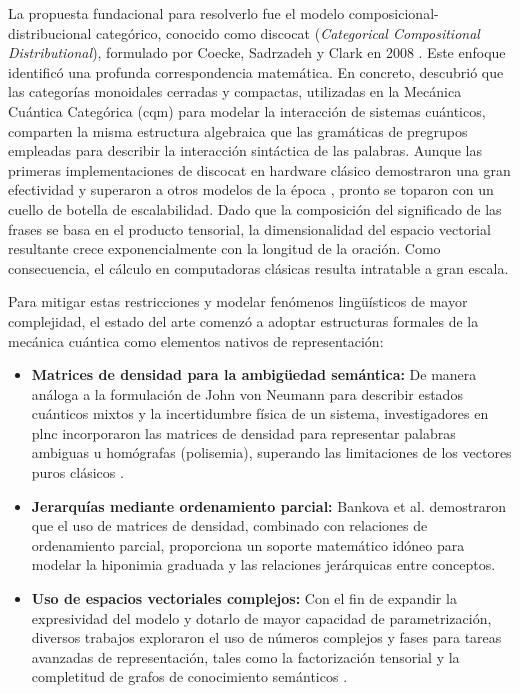 La propuesta fundacional para resolverlo fue el modelo composicional-distribucional categórico, conocido como \gls{discocat} (\textit{Categorical Compositional Distributional}), formulado por Coecke, Sadrzadeh y Clark en 2008 \cite{clark_compositional_distributional_2008}. Este enfoque identificó una profunda correspondencia matemática. En concreto, descubrió que las categorías monoidales cerradas y compactas, utilizadas en la Mecánica Cuántica Categórica (\gls{cqm}) para modelar la interacción de sistemas cuánticos, comparten la misma estructura algebraica que las gramáticas de pregrupos empleadas para describir la interacción sintáctica de las palabras. Aunque las primeras implementaciones de \gls{discocat} en hardware clásico demostraron una gran efectividad y superaron a otros modelos de la época \cite{clark_compositional_distributional_2008}, pronto se toparon con un cuello de botella de escalabilidad. Dado que la composición del significado de las frases se basa en el producto tensorial, la dimensionalidad del espacio vectorial resultante crece exponencialmente con la longitud de la oración. Como consecuencia, el cálculo en computadoras clásicas resulta intratable a gran escala.

Para mitigar estas restricciones y modelar fenómenos lingüísticos de mayor complejidad, el estado del arte comenzó a adoptar estructuras formales de la mecánica cuántica como elementos nativos de representación:
\begin{itemize}
  \item \textbf{Matrices de densidad para la ambigüedad semántica:} De manera análoga a la formulación de John von Neumann para describir estados cuánticos mixtos y la incertidumbre física de un sistema, investigadores en \gls{plnc} incorporaron las matrices de densidad para representar palabras ambiguas u homógrafas (polisemia), superando las limitaciones de los vectores puros clásicos \cite{kartsaklis_compositional_semantics_2014, piedeleu_ambiguity_categorical_2014, piedeleu_quantum_semantics_2015}.
  \item \textbf{Jerarquías mediante ordenamiento parcial:} Bankova et al. \cite{bankova_hyponymy_compositional_2019} demostraron que el uso de matrices de densidad, combinado con relaciones de ordenamiento parcial, proporciona un soporte matemático idóneo para modelar la hiponimia graduada y las relaciones jerárquicas entre conceptos.
  \item \textbf{Uso de espacios vectoriales complejos:} Con el fin de expandir la expresividad del modelo y dotarlo de mayor capacidad de parametrización, diversos trabajos exploraron el uso de números complejos y fases para tareas avanzadas de representación, tales como la factorización tensorial y la completitud de grafos de conocimiento semánticos \cite{blacoe_quantum_theoretic_2013, trouillon_complex_embeddings_2016}.
\end{itemize}

